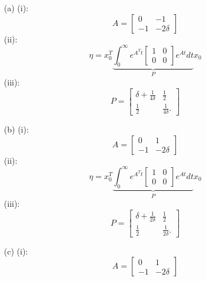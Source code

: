 \documentclass[12pt]{article}
\begin{document}
\begin{itemize}
    \item[(a)] (i):
\begin{equation}
     A = \begin{bmatrix}
        0 & -1\\
        -1 & -2\delta
    \end{bmatrix}
\end{equation}
(ii): 
    \begin{equation}
    \eta =  x_0^T \underbrace{\int_0^{\infty} e^{A^Tt} \begin{bmatrix}
        1 & 0 \\ 0 & 0
    \end{bmatrix} e^{At} dt}_{P} x_0
\end{equation}
(iii): 
\begin{equation}
    P = \begin{bmatrix}
        \delta + \frac{1}{4\delta} & \frac{1}{2} \\ \frac{1}{2} & \frac{1}{4\delta}.
    \end{bmatrix}
\end{equation}
    \item[(b)] (i):
\begin{equation}
     A = \begin{bmatrix}
        0 & 1\\
        -1 & -2\delta
    \end{bmatrix}
\end{equation}
(ii): 
    \begin{equation}
    \eta =  x_0^T \underbrace{\int_0^{\infty} e^{A^Tt} \begin{bmatrix}
        1 & 0 \\ 0 & 0
    \end{bmatrix} e^{At} dt}_{P} x_0
\end{equation}
(iii): 
\begin{equation}
    P = \begin{bmatrix}
        \delta + \frac{1}{2\delta} & \frac{1}{2} \\ \frac{1}{2} & \frac{1}{2\delta}.
    \end{bmatrix}
\end{equation}
    \item[(c)] (i):
\begin{equation}
     A = \begin{bmatrix}
        0 & 1\\
        -1 & -2\delta
    \end{bmatrix}

\end{equation}
\end{itemize}
\end{document}
